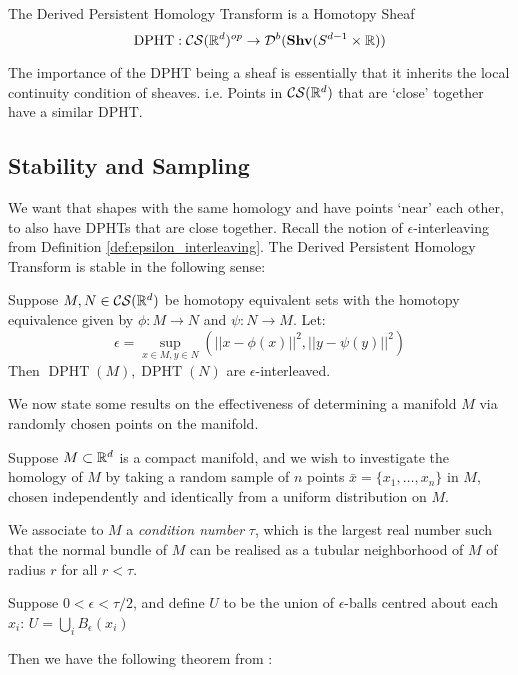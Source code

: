 \begin{theorem}
    The Derived Persistent Homology Transform is a Homotopy Sheaf
    \[\operatorname{DPHT}: \mathcal{CS}(\mathbb{R}^d)^{op}\rightarrow \mathcal{D}^b(\mathbf{Shv}(S^{d-1}\times\mathbb{R}))\]
\end{theorem}

The importance of the DPHT being a sheaf is essentially that it inherits the local continuity condition of sheaves. i.e. Points in \(\mathcal{CS}(\mathbb{R}^d)\) that are `close' together have a similar DPHT. 


\subsection{Stability and Sampling}

We want that shapes with the same homology and have points `near' each other, to also have DPHTs that are close together. Recall the notion of \(\epsilon\)-interleaving from Definition \ref{def:epsilon_interleaving}. The Derived Persistent Homology Transform is stable in the following sense:

\begin{theorem}
    Suppose \(M,N\in \mathcal{CS}(\mathbb{R}^d)\) be homotopy equivalent sets with the homotopy equivalence given by \(\phi:M\rightarrow N\) and \(\psi:N\rightarrow M\). Let: \[\epsilon = \sup_{x\in M, y\in N}\left(||x-\phi(x)||^2, ||y-\psi(y)||^2\right)\]
    Then \(\operatorname{DPHT}(M), \operatorname{DPHT}(N)\) are \(\epsilon\)-interleaved.
\end{theorem}

We now state some results on the effectiveness of determining a manifold \(M\) via randomly chosen points on the manifold. 

Suppose \(M\subset \mathbb{R}^d\) is a compact manifold, and we wish to investigate the homology of \(M\) by taking a random sample of \(n\) points \(\bar{x}=\{x_1,\dots,x_n\}\) in \(M\), chosen independently and identically from a uniform distribution on \(M\). 

We associate to \(M\) a \textit{condition number} \(\tau\), which is the largest real number such that the normal bundle of \(M\) can be realised as a tubular neighborhood of \(M\) of radius \(r\) for all \(r<\tau\). 

Suppose \(0<\epsilon<\tau/2\), and define \(U\) to be the union of \(\epsilon\)-balls centred about each \(x_i\):
\(U=\bigcup_{i}B_\epsilon(x_i)\)

Then we have the following theorem from \cite{Niyogi2008FindingTH}:

